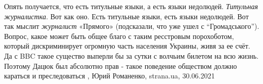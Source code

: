 Опять получается, что есть титульные языки, а есть языки недолюдей.
\emph{Титульная журналистка}.  Вот как оно. Есть титульные языки, есть языки
недолюдей. Вот так мыслит \emph{журналист} «Прямого» (подсказали, что уже ушел
с \enquote{Громадського}). Вопрос, какое может быть общее благо с таким ресстровым
порохоботом, который дискриминирует огромную часть населения Украины, живя за
ее счёт. Да с BBC такое существо выперли бы за сутки с волчьим билетом на всю
жизнь. Поэтому Дацюк был абсолютно прав - такое поведение обществом должно
караться и преследоваться
, Юрий Романенко, strana.ua, 30.06.2021
